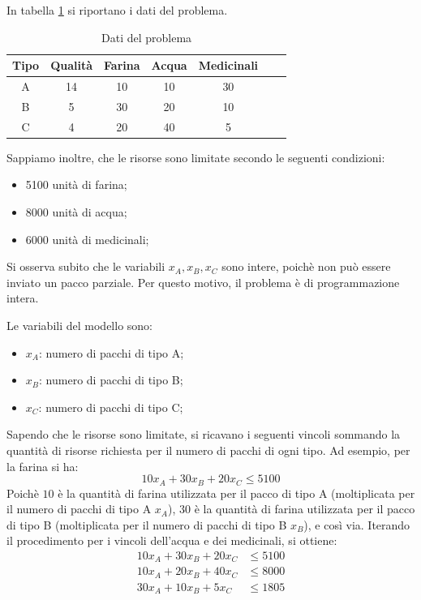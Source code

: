 \documentclass{article}
\begin{document}
In tabella \ref{tabella:dati_esempio1} si riportano i dati del problema.
\begin{table}
  \center
  \begin{tabular}{|c|c|c|c|c|c|c|}
    \hline
    Tipo & Qualità & Farina & Acqua & Medicinali \\
    \hline
    A & 14 & 10 & 10 & 30 \\
    \hline
    B & 5 & 30 & 20 & 10 \\
    \hline
    C & 4 & 20 & 40 & 5 \\
    \hline 
  \end{tabular}
  \caption{Dati del problema}
  \label{tabella:dati_esempio1}
\end{table}
Sappiamo inoltre, che le risorse sono limitate secondo le seguenti condizioni:
\begin{itemize}
\item 5100 unità di farina;
\item 8000 unità di acqua;
\item 6000 unità di medicinali;
\end{itemize}

Si osserva subito che le variabili $x_A, x_B, x_C$ sono intere, poichè non 
può essere inviato un pacco parziale. Per questo motivo, il problema è di 
programmazione intera.

Le variabili del modello sono:
\begin{itemize}

\item $x_A$: numero di pacchi di tipo A;
\item $x_B$: numero di pacchi di tipo B;
\item $x_C$: numero di pacchi di tipo C;
\end{itemize}

Sapendo che le risorse sono limitate, si ricavano i seguenti vincoli sommando la 
quantità di risorse richiesta per il numero di pacchi di ogni tipo. Ad esempio,
per la farina si ha:
\begin{equation*}
  10x_A + 30x_B + 20x_C \leq 5100
\end{equation*}
Poichè $10$ è la quantità di farina utilizzata per il pacco di tipo A (moltiplicata 
per il numero di pacchi di tipo A $x_A$), $30$ è la quantità di farina utilizzata per il
pacco di tipo B (moltiplicata per il numero di pacchi di tipo B $x_B$), e così via. 
Iterando il procedimento per i vincoli dell'acqua e dei medicinali, si ottiene:
\begin{align*}
  10x_A + 30x_B + 20x_C &\leq 5100\\
  10x_A + 20x_B + 40x_C &\leq 8000\\
  30x_A + 10x_B + 5x_C &\leq 1805\\ 
\end{align*}
\end{document}
